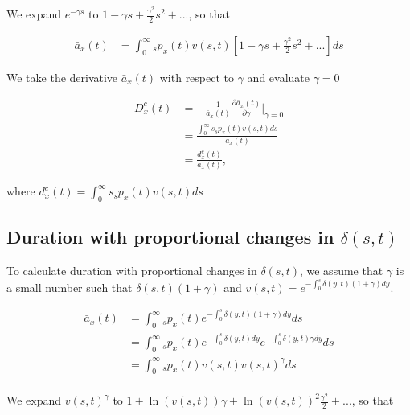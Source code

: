 \documentclass[12pt]{article}
\begin{document}
We expand $e^{-\gamma s}$ to $1-\gamma s+\frac{\gamma^2}{2} s^{2} +...$, so that


\begin{equation}\label{eq:DurationConst1}
\begin{split}
\bar{a}_{x}(t) &= \int_0^\infty {}_sp_x(t) {v}(s,t)[1-\gamma s+\frac{\gamma^2}{2} s^{2} +...]ds
\end{split}
\end{equation}

We take the derivative $\bar{a}_{x}(t)$ with respect to $\gamma$ and evaluate $\gamma=0$


\begin{equation}\label{eq:DurationConst2}
\begin{split}
{D}^{c}_x(t)&=-\frac{1}{\bar{a}_x(t)}\frac{\partial \bar{a}_x(t)}{\partial \gamma} \bigg\rvert_{\gamma=0}\\
              &= \frac{\int_0^\infty s {}_sp_x(t) {v}(s,t)ds}{\bar{a}_x(t)} \\
              &= \frac{{d}^{c}_x(t)}{\bar{a}_x(t)},
\end{split}
\end{equation}

where ${d}^{c}_x(t)=\int_0^\infty s {}_sp_x(t) {v}(s,t)ds$



\subsection{Duration with proportional changes in $\delta(s,t)$} \label{sec:DurProp}

To calculate duration with proportional changes in $\delta(s,t)$, we assume that $\gamma$ is a small number such that $\delta(s,t)(1+\gamma)$ and  ${v}(s,t)=e^{-\int_0^{s}  \delta(y,t)(1+\gamma)dy}$.


\begin{equation}\label{eq:DurationProp1}
\begin{split}
\bar{a} _x(t) &= \int_0^\infty {}_sp_x(t) e^{-\int_0^{s}\delta(y,t)(1+\gamma)dy}ds \\
&= \int_0^\infty {}_sp_x(t) e^{-\int_0^{s}\delta(y,t)dy}e^{-\int_0^{s}\delta(y,t)\gamma dy}ds \\
&= \int_0^\infty {}_sp_x(t) v(s,t)v(s,t)^{\gamma}ds \\
\end{split}
\end{equation}


We expand $v(s,t)^{\gamma}$ to $1+\ln(v(s,t)) \gamma+{\ln(v(s,t))}^2 \frac{\gamma^2}{2}+...$, so that
\end{document}
